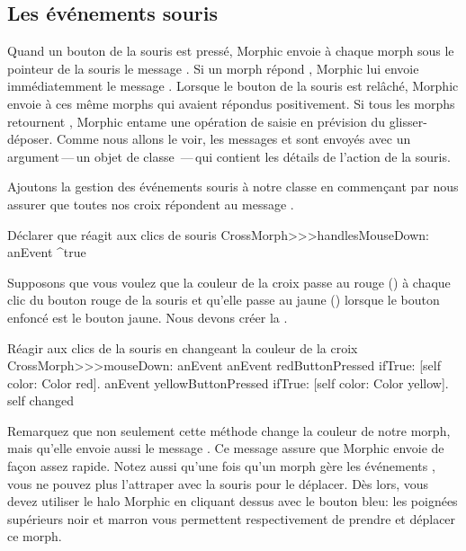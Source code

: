 \documentclass[a4paper,10pt,twoside]{book}
\begin{document}
\subsection{Les \'ev\'enements souris}

Quand un bouton de la souris est press\'e, Morphic envoie \`a chaque
morph sous le pointeur de la souris le message
. Si un morph r\'epond , Morphic lui
envoie imm\'ediatemment le message . Lorsque
le bouton de la souris est rel\^ach\'e, Morphic envoie
  \`a ces m\^eme morphs qui avaient r\'epondus
positivement. Si tous les morphs retournent , Morphic entame
une op\'eration de
saisie en pr\'evision du glisser-d\'eposer.
Comme nous allons le voir, les messages  et 
sont envoy\'es avec un argument\,---\,un objet de classe
\,---\,qui contient les d\'etails de l'action de la souris.

Ajoutons la gestion des \'ev\'enements souris \`a notre classe
 en commen\c{c}ant par nous assurer que toutes nos
croix r\'epondent  au message .

\begin{method}{D\'eclarer que  r\'eagit aux clics de souris}
CrossMorph>>>handlesMouseDown: anEvent
	^true
\end{method}

Supposons que vous voulez que la couleur de la croix passe au rouge
()
\`a chaque clic du bouton rouge de la souris et qu'elle passe au jaune
()
lorsque le bouton enfonc\'e est le bouton jaune. 
Nous devons cr\'eer la .

\begin{method}[mouseDown]{R\'eagir aux clics de la souris en changeant la couleur de la croix}
CrossMorph>>>mouseDown: anEvent
	anEvent redButtonPressed
		ifTrue: [self color: Color red].
	anEvent yellowButtonPressed
		ifTrue: [self color: Color yellow].
	self changed
\end{method}

Remarquez que non seulement cette m\'ethode change la couleur de notre
morph, mais qu'elle envoie aussi le message .
Ce message assure que Morphic envoie 
de fa\c{c}on assez rapide.
Notez aussi qu'une fois qu'un morph g\`ere les événements , vous ne pouvez plus l'attraper avec la souris pour le d\'eplacer.
D\`es lors, vous devez utiliser le halo Morphic en cliquant dessus avec le
bouton bleu: les poign\'ees sup\'erieurs noir \grabHandle{}
et marron \moveHandle{} 
vous permettent respectivement de prendre et d\'eplacer ce morph.
\end{document}
